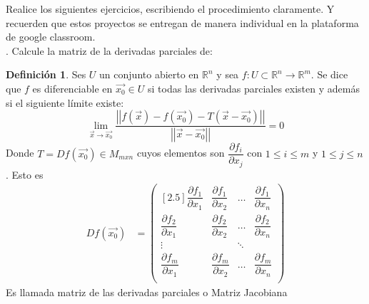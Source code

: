 \documentclass[letterpaper]{article}
\renewcommand{\d}{\partial}
\providecommand{\norm}[1]{\left|\left|#1\right|\right|}
\newcommand{\R}{\mathds{R}}
\renewcommand{\*}{\cdot}
\theoremstyle{definition}
\newtheorem{definition}{Definición}
\begin{document}
\noindent Realice los siguientes ejercicios, escribiendo el procedimiento claramente. Y recuerden que estos proyectos se entregan de manera individual en la plataforma de google classroom.\\





.  Calcule la matriz de la derivadas parciales de: 

\begin{definition}
	Ses $ U $ un conjunto abierto en $ \R^n $ y sea $ f:U\subset \R^n \to \R^m $. Se dice que $ f $ es diferenciable en $ \vec{x_0} \in U$  si todas las derivadas parciales existen y además si el siguiente límite existe: 
	\[ \lim\limits_{\vec{x} \to \vec{x_0} } \dfrac{\norm{f(\vec{x}) - f(\vec{x_0}) - T(\vec{x} - \vec{x_0})} }{\norm{\vec{x} - \vec{x_0}}} =0 \]
	Donde $ T= Df(\vec{x_0}) \in M_{mxn} $ cuyos elementos son $ \dfrac{\partial f_i}{\partial x_j} $ con $ 1 \leq i \leq m $ y $ 1 \leq j \leq n $. Esto es
	\begin{align*}
		Df(\vec{x_0}) &= \begin{pmatrix}[2.5]
		\dfrac{\partial f_1}{\d x_1 } & \dfrac{\d f_1}{\d x_2} & \dots & \dfrac{\d f_1}{\d x_n}\\
		\dfrac{\partial f_2}{\d x_1 } & \dfrac{\d f_2}{\d x_2} & \dots & \dfrac{\d f_2}{\d x_n}\\
		\vdots & & \ddots & \\
		\dfrac{\partial f_m}{\d x_1 } & \dfrac{\d f_m}{\d x_2} & \dots & \dfrac{\d f_m}{\d x_n}\\
		\end{pmatrix}
	\end{align*}
	Es llamada matriz de las derivadas parciales o Matriz Jacobiana
\end{definition}
\end{document}
